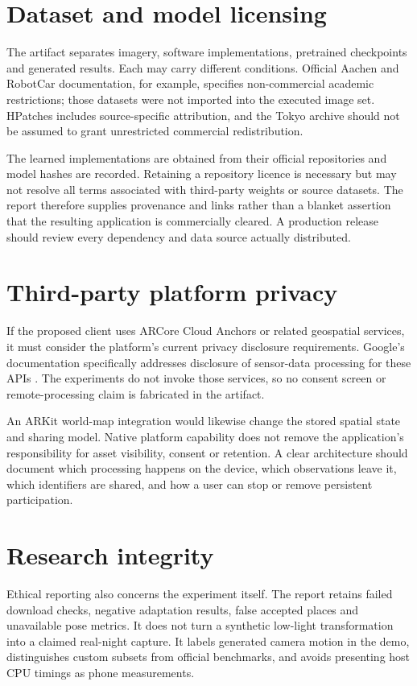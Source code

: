 \section{Dataset and model licensing}
The artifact separates imagery, software implementations, pretrained checkpoints and generated results. Each may carry different conditions. Official Aachen and RobotCar documentation, for example, specifies non-commercial academic restrictions; those datasets were not imported into the executed image set. HPatches includes source-specific attribution, and the Tokyo archive should not be assumed to grant unrestricted commercial redistribution.

The learned implementations are obtained from their official repositories and model hashes are recorded. Retaining a repository licence is necessary but may not resolve all terms associated with third-party weights or source datasets. The report therefore supplies provenance and links rather than a blanket assertion that the resulting application is commercially cleared. A production release should review every dependency and data source actually distributed.

\ifFullReport
\section{Third-party platform privacy}
If the proposed client uses ARCore Cloud Anchors or related geospatial services, it must consider the platform's current privacy disclosure requirements. Google's documentation specifically addresses disclosure of sensor-data processing for these APIs \citep{arprivacy}. The experiments do not invoke those services, so no consent screen or remote-processing claim is fabricated in the artifact.

An ARKit world-map integration would likewise change the stored spatial state and sharing model. Native platform capability does not remove the application's responsibility for asset visibility, consent or retention. A clear architecture should document which processing happens on the device, which observations leave it, which identifiers are shared, and how a user can stop or remove persistent participation.
\fi

\ifFullReport
\section{Research integrity}
Ethical reporting also concerns the experiment itself. The report retains failed download checks, negative adaptation results, false accepted places and unavailable pose metrics. It does not turn a synthetic low-light transformation into a claimed real-night capture. It labels generated camera motion in the demo, distinguishes custom subsets from official benchmarks, and avoids presenting host CPU timings as phone measurements.

